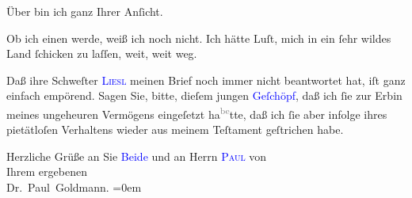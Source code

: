 \pstart
           {\pb}Über \label{K_L03530-3v}\label{K_L03530-3h} bin ich ganz Ihrer Anſicht.\pend
           
\pstart
           Ob ich einen \label{K_L03530-4v}\label{K_L03530-4h} werde, weiß ich noch nicht. Ich hätte Luſt, mich in ein ſehr wildes Land
               ſchicken zu laſſen, weit, weit weg.\pend
           
\pstart
           Daß ihre Schweſter \textsc{\textcolor{blue}{Liesl}{}\ledrightnote{\textcolor{blue}{Elisabeth Steinrück}}} meinen Brief noch immer nicht beantwortet hat, iſt ganz einfach empörend. Sagen
               Sie, bitte, dieſem jungen \textcolor{blue}{Geſchöpf}{}\ledrightnote{{$\rightarrow$}\textcolor{blue}{Elisabeth Steinrück}}, daß ich ſie zur Erbin meines ungeheuren Vermögens eingeſetzt ha\substVorne{}\textsuperscript{\textcolor{gray}{be}}\substDazwischen{}tte\substHinten{}, daß ich ſie aber infolge ihres pietätloſen Verhaltens wieder {\pb}aus meinem Teſtament geſtrichen habe.\pend
           
\pstart
           Herzliche Grüße an Sie \textcolor{blue}{}{}\ledrightnote{{$\rightarrow$}\textcolor{blue}{Elisabeth Steinrück}}{ }\textcolor{blue}{Beide}{}\ledrightnote{{$\rightarrow$}\textcolor{blue}{Elisabeth Steinrück}} und an Herrn \textsc{\textcolor{blue}{Paul}{}\ledrightnote{\textcolor{blue}{Paul Marx}}} von {\\[\baselineskip]}Ihrem ergebenen {\\[\baselineskip]}\spacefill\mbox{Dr. Paul Goldmann.}\pend
           \leftskip=0em{}\endnumbering{}  
      